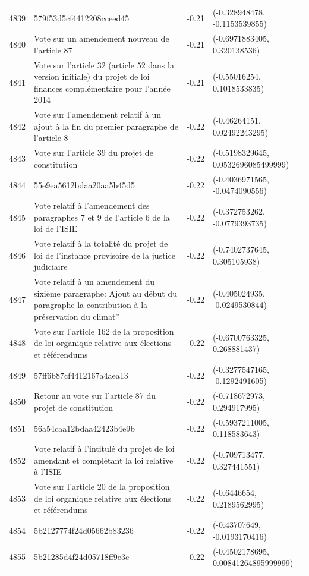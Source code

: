 \begin{table}[ht]
\begin{tabular}{rlrl}
  4839 & 579f53d5cf4412208cceed45 & -0.21 & (-0.328948478, -0.1153539855) \\ 
  4840 & Vote sur un amendement nouveau de l'article 87 & -0.21 & (-0.6971883405, 0.320138536) \\ 
  4841 & Vote sur l'article 32 (article 52 dans la version initiale) du projet de loi finances complémentaire pour l'année 2014 & -0.21 & (-0.55016254, 0.1018533835) \\ 
  4842 & Vote sur l'amendement relatif à un ajout à la fin du premier paragraphe de l'article 8 & -0.22 & (-0.46264151, 0.02492243295) \\ 
  4843 & Vote sur l'article 39 du projet de constitution & -0.22 & (-0.5198329645, 0.0532696085499999) \\ 
  4844 & 55e9ea5612bdaa20aa5b45d5 & -0.22 & (-0.4036971565, -0.0474090556) \\ 
  4845 & Vote relatif à l'amendement des paragraphes 7 et 9 de l'article 6 de la loi de l'ISIE & -0.22 & (-0.372753262, -0.0779393735) \\ 
  4846 & Vote relatif à la totalité du projet de loi de l'instance provisoire de la justice judiciaire & -0.22 & (-0.7402737645, 0.305105938) \\ 
  4847 & Vote relatif à un amendement du sixième paragraphe: Ajout au début du paragraphe la contribution à la préservation du climat” & -0.22 & (-0.405024935, -0.0249530844) \\ 
  4848 & Vote sur l'article 162 de la proposition de loi organique relative aux élections et référendums & -0.22 & (-0.6700763325, 0.268881437) \\ 
  4849 & 57ff6b87cf4412167a4aea13 & -0.22 & (-0.3277547165, -0.1292491605) \\ 
  4850 & Retour au vote sur l'article 87 du projet de constitution & -0.22 & (-0.718672973, 0.294917995) \\ 
  4851 & 56a54caa12bdaa42423b4e9b & -0.22 & (-0.5937211005, 0.118583643) \\ 
  4852 & Vote relatif à l'intitulé du projet de loi amendant et complétant la loi relative à l'ISIE & -0.22 & (-0.709713477, 0.327441551) \\ 
  4853 & Vote sur l'article 20 de la proposition de loi organique relative aux élections et référendums & -0.22 & (-0.6446654, 0.2189562995) \\ 
  4854 & 5b2127774f24d05662b83236 & -0.22 & (-0.43707649, -0.0193170416) \\ 
  4855 & 5b21285d4f24d05718ff9e3c & -0.22 & (-0.4502178695, 0.00841264895999999) \\ 

\end{tabular}
\end{table}
